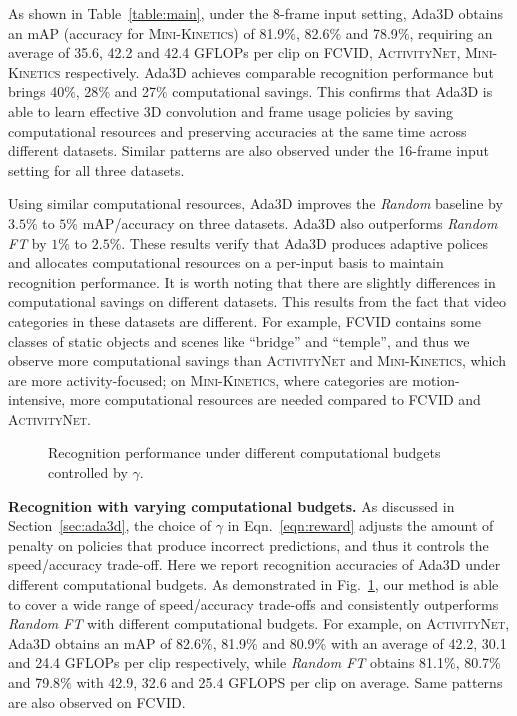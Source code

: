 \documentclass[final]{cvpr}
\newcommand{\anet}{{\scshape ActivityNet}\xspace}
\newcommand{\fcvid}{{\scshape FCVID}\xspace}
\newcommand{\minik}{{\scshape Mini-Kinetics}\xspace}
\newcommand{\system}{{Ada3D}\xspace}
\begin{document}
As shown in Table~\ref{table:main}, under the 8-frame input setting, \system obtains an mAP (accuracy for \minik) of 81.9$\%$, 82.6$\%$ and 78.9$\%$, requiring an average of 35.6, 42.2 and 42.4 GFLOPs per clip on \fcvid, \anet, \minik respectively. 
\system achieves comparable recognition performance but brings 40$\%$, 28$\%$ and 27$\%$ computational savings. This confirms that \system is able to learn effective 3D convolution and frame usage policies by saving computational resources and preserving accuracies at the same time across different datasets. Similar patterns are also observed under the 16-frame input setting for all three datasets.

Using similar computational resources, \system improves the \emph{Random} baseline by $3.5\%$ to $5\%$ mAP/accuracy on three datasets. \system also outperforms \emph{Random FT} by $1\%$ to $2.5\%$. These results verify that \system produces adaptive polices and allocates computational resources on a per-input basis to maintain recognition performance. It is worth noting that there are slightly differences in computational savings on different datasets. This results from the fact that video categories in these datasets are different. For example, FCVID contains some classes of static objects and scenes like ``bridge'' and ``temple'', and thus we observe more computational savings than \anet and \minik, which are more activity-focused; on \minik, where categories are motion-intensive, more computational resources are needed compared to \fcvid and \anet.

\begin{figure}[!b] \centering
   \vspace{-0.12in}
   \caption{Recognition performance under different computational budgets controlled by $\gamma$.}
   \label{fig:ablation}
\end{figure}

\vspace{0.05in}
\noindent\textbf{Recognition with varying computational budgets.} As discussed in Section~\ref{sec:ada3d}, the choice of $\gamma$ in Eqn.~\ref{eqn:reward} adjusts the amount of penalty on policies that produce incorrect predictions, and thus it controls the speed/accuracy trade-off. Here we report recognition accuracies of \system under different computational budgets. As demonstrated in Fig.~\ref{fig:ablation}, our method is able to cover a wide range of speed/accuracy trade-offs and consistently outperforms \emph{Random FT} with different computational budgets. For example, on \anet, \system obtains an mAP of 82.6$\%$, 81.9$\%$ and 80.9$\%$ with an average of 42.2, 30.1 and 24.4 GFLOPs per clip respectively, while \emph{Random FT} obtains 81.1$\%$, 80.7$\%$ and 79.8$\%$ with 42.9, 32.6 and 25.4 GFLOPS per clip on average. Same patterns are also observed on \fcvid. 
\end{document}

